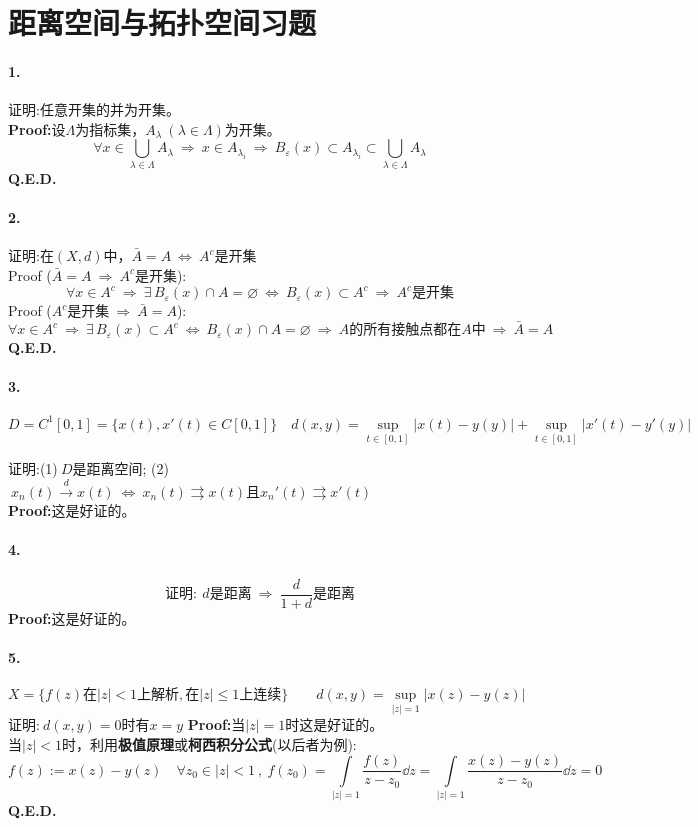 \section{距离空间与拓扑空间习题}
\paragraph*{1.}证明:任意开集的并为开集。\\
\textbf{Proof:}设$\Lambda$为指标集，$A_{\lambda} \ (\lambda \in \Lambda)$为开集。
\[\forall x \in \bigcup_{\lambda \in \Lambda}A_{\lambda} \ \Rightarrow \ x \in A_{\lambda_i} \ \Rightarrow \ B_{\varepsilon}(x) \subset A_{\lambda_i} \subset \bigcup_{\lambda \in \Lambda}A_{\lambda}\]
\textbf{Q.E.D.}

\paragraph*{2.}证明:在$(X,d)$中，$\bar{A}=A \ \Leftrightarrow \ A^c$是开集\\
Proof ($\bar{A}=A \ \Rightarrow \ A^c$是开集):
\[\forall x \in A^c \ \Rightarrow \ \exists \, B_{\varepsilon}(x) \cap A=\varnothing \ \Leftrightarrow \ B_{\varepsilon}(x) \subset A^c \ \Rightarrow \ A^c\text{是开集}\]
Proof ($A^c$是开集$ \ \Rightarrow \ \bar{A}=A$):
\[\forall x \in A^c \ \Rightarrow \ \exists \, B_{\varepsilon}(x) \subset A^c \ \Leftrightarrow \ B_{\varepsilon}(x) \cap A=\varnothing \ \Rightarrow \ A\text{的所有接触点都在$A$中} \ \Rightarrow \ \bar{A}=A\]
\textbf{Q.E.D.}

\paragraph*{3.}
\[D=C^1[0,1]=\{x(t),x'(t) \in C[0,1]\} \quad d(x,y)=\mathop \text{sup}\limits_{t \in [0,1]}|x(t)-y(y)|+\mathop \text{sup}\limits_{t \in [0,1]}|x'(t)-y'(y)|\]

证明:(1)$\ D$是距离空间; \quad (2)$\ x_n(t) \xrightarrow{d} x(t) \ \Leftrightarrow \ x_n(t) \rightrightarrows x(t)\text{且}x_n'(t) \rightrightarrows x'(t)$\\
\textbf{Proof:}这是好证的。

\paragraph*{4.}
\[\text{证明}: \ d\text{是距离} \ \Rightarrow \ \frac{d}{1+d}\text{是距离}\]
\textbf{Proof:}这是好证的。

\paragraph*{5.}
\[X=\{f(z)\text{在}|z|<1\text{上解析},\text{在}|z| \leq 1\text{上连续}\} \qquad d(x,y)=\mathop \text{sup}\limits_{|z|=1}|x(z)-y(z)|\]
证明:$\ d(x,y)=0$时有$x=y$
\textbf{Proof:}当$|z|=1$时这是好证的。\\
当$|z|<1$时，利用\textbf{极值原理}或\textbf{柯西积分公式}(以后者为例):
\[f(z):=x(z)-y(z) \quad \forall z_0 \in |z|<1 \ , \ f(z_0)=\int\limits_{|z|=1}\frac{f(z)}{z-z_0}\dd z=\int\limits_{|z|=1}\frac{x(z)-y(z)}{z-z_0}\dd z=0\]
\textbf{Q.E.D.}

